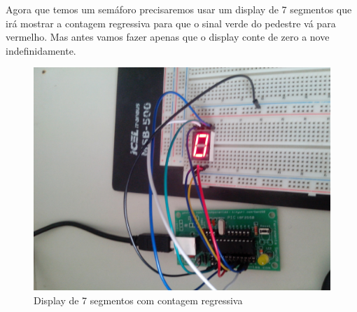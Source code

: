 Agora que temos um semáforo precisaremos usar um display de 7 segmentos
que irá mostrar a contagem regressiva para que o sinal verde do pedestre
vá para vermelho. Mas antes vamos fazer apenas que o display conte de
zero a nove indefinidamente.

\begin{figure}[H]
    \includegraphics[scale=0.15]{img/display-7seg-1.jpg}
    \caption{Display de 7 segmentos com contagem regressiva}
\end{figure}
